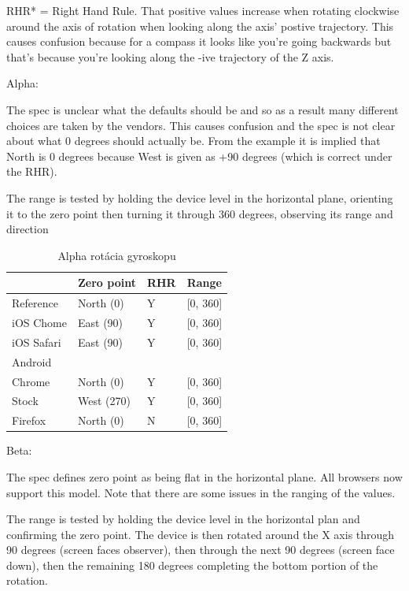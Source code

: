 RHR* = Right Hand Rule. That positive values increase when rotating clockwise
around the axis of rotation when looking along the axis' postive trajectory. This causes confusion because for a compass it looks like you're going backwards but that's because you're looking along the -ive trajectory of the Z axis.

Alpha:

The spec is unclear what the defaults should be and so as a result many different choices are taken by the vendors. This causes confusion and the spec is not clear about what 0 degrees should actually be. From the example it is implied that North is 0 degrees because West is given as +90 degrees (which is correct under the RHR).

The range is tested by holding the device level in the horizontal plane, orienting it to the zero point then turning it through 360 degrees, observing its range and direction

\begin{table}[H]
  \begin{tabular}{ | l | l | l | l |}
  \hline
              & Zero point  & RHR   & Range \\ \hline
  Reference   & North (0)   & Y     & [0, 360] \\  
  iOS Chome   & East (90)   & Y     & [0, 360] \\  
  iOS Safari  & East (90)   & Y     & [0, 360] \\  
  Android & & & \\  
  Chrome      & North (0)   & Y     & [0, 360] \\  
  Stock       & West (270)  & Y     & [0, 360] \\  
  Firefox     & North (0)   & N     & [0, 360] \\
  \hline
  \end{tabular}
  \caption[Alpha rotácia gyroskopu]{Alpha rotácia gyroskopu}
\end{table}

Beta:

The spec defines zero point as being flat in the horizontal plane. All browsers now support this model. Note that there are some issues in the ranging of the values.

The range is tested by holding the device level in the horizontal plan and confirming the zero point. The device is then rotated around the X axis through 90 degrees (screen faces observer), then through the next 90 degrees (screen face down), then the remaining 180 degrees completing the bottom portion of the rotation.

